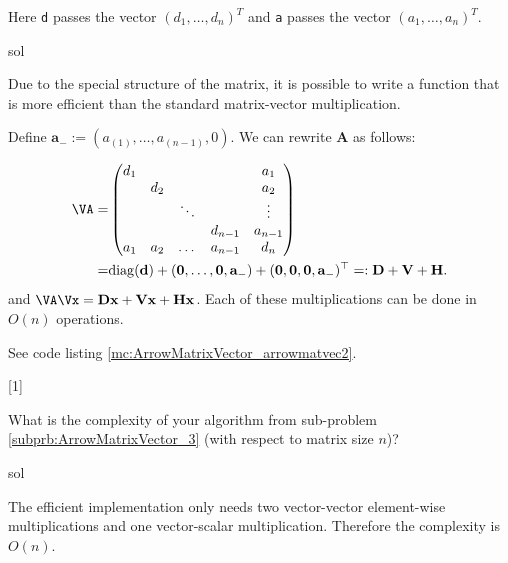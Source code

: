 \begin{samproblem}
\begin{subproblem}{}
Here \texttt{d} passes the vector $(d_{1},\ldots,d_{n})^{T}$ and \texttt{a} passes the
vector $(a_{1},\ldots,a_{n})^{T}$.
 \begin{samwriteprbpart}{sol}
\begin{samsolution}
  Due to the special structure of the matrix, it is possible to write a function that is more efficient
  than the standard matrix-vector multiplication.

  Define $\mathbf{a}_- := (a_{(1)}, \dots, a_{(n-1)}, 0)$.
  We can rewrite $\mathbf{A}$ as follows:

    \begin{align}
    \VA= & \begin{pmatrix}
      d_1 &     &        &         & a_1     \\
          & d_2 &        &         & a_2     \\
          &     & \ddots &         & \vdots  \\
          &     &        & d_{n-1}  & a_{n-1} \\
      a_1 & a_2 & \dots  & a_{n-1}   & d_n     \\
    \end{pmatrix} \\
    = & \mathrm{diag}(\mathbf{d}) + (\mathbf{0},\dots,\mathbf{0}, \mathbf{a}_-) + (\mathbf{0},\mathbf{0},\mathbf{0},\mathbf{a}_-)^\top
    =: \mathbf{D} + \mathbf{V} + \mathbf{H}.
    \end{align}
    and $\VA \Vx = \mathbf{D} \mathbf{x} + \mathbf{V} \mathbf{x} + \mathbf{H} \mathbf{x}$. Each of these
    multiplications can be done in $O(n)$ operations.

    See code listing \ref{mc:ArrowMatrixVector_arrowmatvec2}.
\vspace{0.5cm}

[1]

\end{samsolution}
\end{samwriteprbpart}
\end{subproblem}

\begin{subproblem}{}
What is the complexity of your algorithm from sub-problem
\ref{subprb:ArrowMatrixVector_3} (with respect to matrix size $n$)?
 \begin{samwriteprbpart}{sol}
\begin{samsolution}
  The efficient implementation only needs two vector-vector element-wise multiplications and
  one vector-scalar multiplication. Therefore the complexity is $O(n)$.
\end{samsolution}
\end{samwriteprbpart}
\end{subproblem}


\end{samproblem}
